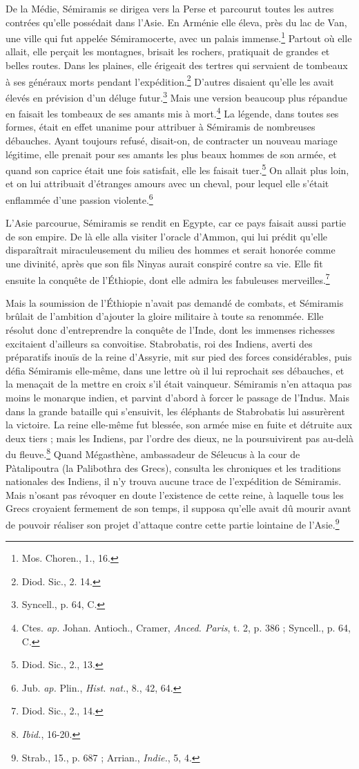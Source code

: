 \documentclass[a4paper, 11pt, oneside]{article}
\begin{document}
De la Médie, Sémiramis se dirigea vers la Perse et parcourut toutes les autres contrées qu'elle possédait dans l'Asie. En Arménie elle éleva, près du lac de Van, une ville qui fut appelée Sémiramocerte, avec un palais immense.\footnote{Mos. Choren., 1., 16.} Partout où elle allait, elle perçait les montagnes, brisait les rochers, pratiquait de grandes et belles routes. Dans les plaines, elle érigeait des tertres qui servaient de tombeaux à ses généraux morts pendant l'expédition.\footnote{Diod. Sic., 2. 14.} D'autres disaient qu'elle les avait élevés en prévision d'un déluge futur.\footnote{Syncell., p. 64, C.} Mais une version beaucoup plus répandue en faisait les tombeaux de ses amants mis à mort.\footnote{Ctes. \emph{ap.} Johan. Antioch., Cramer, \emph{Anced. Paris}, t. 2, p. 386 ; Syncell., p. 64, C.} La légende, dans toutes ses formes, était en effet unanime pour attribuer à Sémiramis de nombreuses débauches. Ayant toujours refusé, disait-on, de contracter un nouveau mariage légitime, elle prenait pour ses amants les plus beaux hommes de son armée, et quand son caprice était une fois satisfait, elle les faisait tuer.\footnote{Diod. Sic., 2., 13.} On allait plus loin, et on lui attribuait d'étranges amours avec un cheval, pour lequel elle s'était enflammée d'une passion violente.\footnote{Jub. \emph{ap.} Plin., \emph{Hist. nat.}, 8., 42, 64.}

L'Asie parcourue, Sémiramis se rendit en Egypte, car ce pays faisait aussi partie de son empire. De là elle alla visiter l'oracle d'Ammon, qui lui prédit qu'elle disparaîtrait miraculeusement du milieu des hommes et serait honorée comme une divinité, après que son fils Ninyas aurait conspiré contre sa vie. Elle fit ensuite la conquête de l'Éthiopie, dont elle admira les fabuleuses merveilles.\footnote{Diod. Sic., 2., 14.}

Mais la soumission de l'Éthiopie n'avait pas demandé de combats, et Sémiramis brûlait de l'ambition d'ajouter la gloire militaire à toute sa renommée. Elle résolut donc d'entreprendre la conquête de l'Inde, dont les immenses richesses excitaient d'ailleurs sa convoitise. Stabrobatis, roi des Indiens, averti des préparatifs inouïs de la reine d'Assyrie, mit sur pied des forces considérables, puis défia Sémiramis elle-même, dans une lettre où il lui reprochait ses débauches, et la menaçait de la mettre en croix s'il était vainqueur. Sémiramis n'en attaqua pas moins le monarque indien, et parvint d'abord à forcer le passage de l'Indus. Mais dans la grande bataille qui s'ensuivit, les éléphants de Stabrobatis lui assurèrent la victoire. La reine elle-même fut blessée, son armée mise en fuite et détruite aux deux tiers ; mais les Indiens, par l'ordre des dieux, ne la poursuivirent pas au-delà du fleuve.\footnote{\emph{Ibid.}, 16-20.} Quand Mégasthène, ambassadeur de Séleucus à la cour de Pàtalipoutra (la Palibothra des Grecs), consulta les chroniques et les traditions nationales des Indiens, il n'y trouva aucune trace de l'expédition de Sémiramis. Mais n'osant pas révoquer en doute l'existence de cette reine, à laquelle tous les Grecs croyaient fermement de son temps, il supposa qu'elle avait dû mourir avant de pouvoir réaliser son projet d'attaque contre cette partie lointaine de l'Asie.\footnote{Strab., 15., p. 687 ; Arrian., \emph{Indie.}, 5, 4.}
\end{document}
